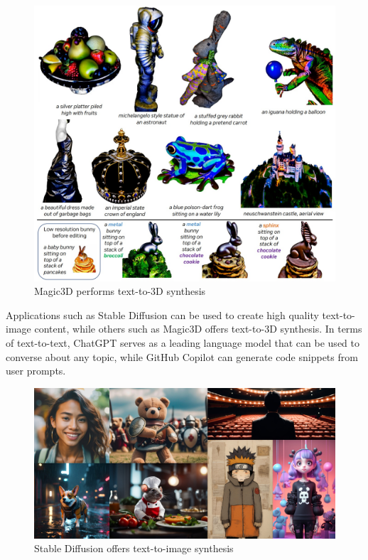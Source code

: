 \begin{figure}[H]
    \centering
    \includegraphics[width=\textwidth, height=0.5\textheight, keepaspectratio]{Images/Magic3D.jpg}
    \caption{Magic3D performs text-to-3D synthesis \cite{Magic3D}}
    \label{fig:magic3D}
\end{figure}

Applications such as Stable Diffusion \cite{Stable_Diffusion} can be used to create high quality text-to-image content, while others such as Magic3D \cite{Magic3D} offers text-to-3D synthesis. In terms of text-to-text, ChatGPT \cite{Chat_GPT} serves as a leading language model that can be used to converse about any topic, while GitHub Copilot \cite{GitHub_Copilot} can generate code snippets from user prompts.

\begin{figure}[H]
    \centering
    \includegraphics[width=\textwidth, height=0.3\textheight, keepaspectratio]{Images/StableDiffusion.jpg}
    \caption{Stable Diffusion offers text-to-image synthesis \cite{Stable_Diffusion}}
    \label{fig:stableDiffusion}
\end{figure}

